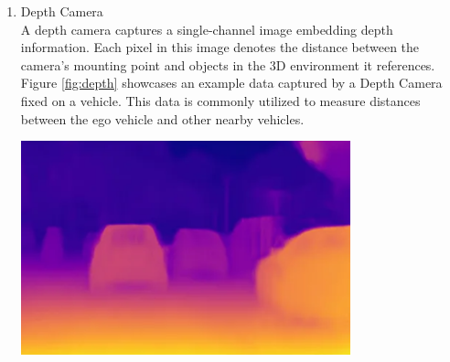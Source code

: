 \documentclass[12pt,twoside,a4paper,parskip]{scrbook} %
\begin{document}
\begin{enumerate}[label=\alph*.]
    \item Depth Camera \\
    A depth camera captures a single-channel image embedding depth information. Each pixel in this image denotes the distance between the camera's mounting point and objects in the 3D environment it references. Figure \ref{fig:depth} showcases an example data captured by a Depth Camera fixed on a vehicle. This data is commonly utilized to measure distances between the ego vehicle and other nearby vehicles.
    \begin{minipage}[t]{\linewidth}
        \centering
        \includegraphics[width=0.75\textwidth]{Images/Dethcam.png}
        \label{fig:depth}
        \vspace{-\baselineskip} %
    \end{minipage}
    \hfill
    

\end{enumerate}
\end{document}
